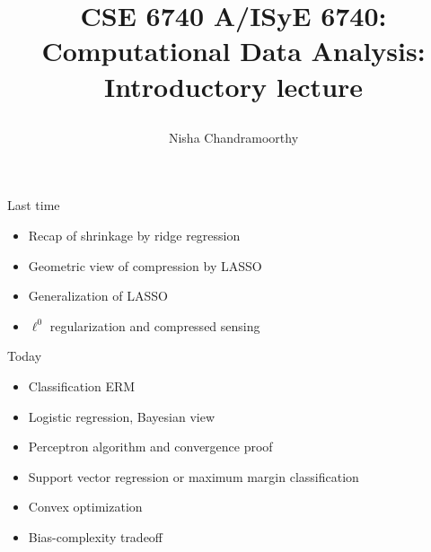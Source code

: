 \documentclass[final]{beamer}
\title{\begin{huge}{CSE 6740 A/ISyE 6740: Computational Data Analysis: Introductory lecture}\end{huge}} %
\author{Nisha Chandramoorthy} %
\begin{document}
\frame{\titlepage}

\begin{frame}{Last time}
\begin{itemize}
	\item Recap of shrinkage by ridge regression
	\pause
	\item Geometric view of compression by LASSO
	\pause
	\item Generalization of LASSO 
	\pause 
	\item $\ell^0$ regularization and compressed sensing
\end{itemize}
\end{frame}
\begin{frame}{Today}
	\begin{itemize}
	\item Classification ERM
	\pause
	\item Logistic regression, Bayesian view
	\pause
	\item Perceptron algorithm and convergence proof
	\pause
	\item Support vector regression or maximum margin classification
	\pause 
	\item Convex optimization
	\pause 
	\item Bias-complexity tradeoff 
	\end{itemize}
\end{frame}
\begin{frame}{}

\end{frame}
\end{document}
